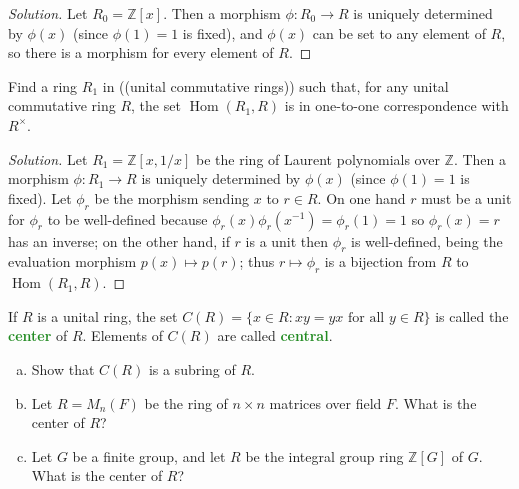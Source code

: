 \documentclass[10pt]{article}
\providecommand{\ZZ}{\mathbb Z}
\providecommand{\ii}{\item}
\providecommand{\inv}{^{-1}}
\newenvironment{soln}{\begin{proof}[Solution]}{\end{proof}}
\providecommand{\vocab}[1]{{\textbf{\textcolor{ForestGreen}{#1}}}}
\providecommand{\Hom}{\operatorname{Hom}}
\newcommand{\doubleparen}[1]{(\!(#1)\!)}
\begin{document}
\begin{soln}
    Let $R_0 = \ZZ[x]$. Then a morphism $\phi\colon R_0\to R$
    is uniquely determined by $\phi(x)$ (since $\phi(1) = 1$ is fixed),
    and $\phi(x)$ can be set to any element of $R$,
    so there is a morphism for every element of $R$.
\end{soln}

\begin{problem}
    Find a ring $R_1$ in \doubleparen{unital commutative rings}
    such that, for any unital commutative ring $R$,
    the set $\Hom(R_1,R)$ is in one-to-one correspondence with $R^\times$.
\end{problem}

\begin{soln}
    Let $R_1 = \ZZ[x,1/x]$ be the ring of Laurent polynomials over $\ZZ$.
    Then a morphism $\phi\colon R_1\to R$
    is uniquely determined by $\phi(x)$ (since $\phi(1) = 1$ is fixed).
    Let $\phi_r$ be the morphism sending $x$ to $r\in R$.
    On one hand $r$ must be a unit for $\phi_r$ to be well-defined
    because $\phi_r(x)\phi_r(x\inv) = \phi_r(1) = 1$
    so $\phi_r(x) = r$ has an inverse; on the other hand,
    if $r$ is a unit then $\phi_r$ is well-defined,
    being the evaluation morphism $p(x)\mapsto p(r)$;
    thus $r\mapsto \phi_r$ is a bijection from $R$ to $\Hom(R_1,R)$.
\end{soln}

\begin{problem}
    If $R$ is a unital ring, the set
    $C(R) = \{x\in R : xy = yx \text{ for all }y\in R\}$
    is called the \vocab{center} of $R$.
    Elements of $C(R)$ are called \vocab{central}.
    \begin{enumerate}[(a)]
        \ii Show that $C(R)$ is a subring of $R$.
	\ii Let $R = M_n(F)$ be the ring of $n\times n$ matrices over field $F$.
	What is the center of $R$?
	\ii Let $G$ be a finite group, and let $R$ be
	the integral group ring $\ZZ[G]$ of $G$.
	What is the center of $R$?
    \end{enumerate}
\end{problem}
\end{document}
